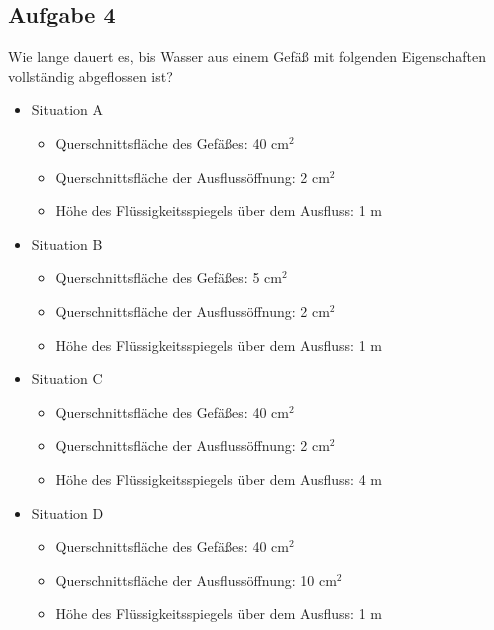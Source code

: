 \documentclass[nobib]{tufte-book}
\begin{document}
\pagebreak
\subsection*{Aufgabe 4}
Wie lange dauert es, bis Wasser aus einem Gefäß mit folgenden Eigenschaften vollständig abgeflossen ist?

\begin{itemize}
\item Situation A
\begin{itemize}
    \item  Querschnittsfläche des Gefäßes: 40 cm$^2$
    \item  Querschnittsfläche der Ausflussöffnung: 2 cm$^2$
    \item  Höhe des Flüssigkeitsspiegels über dem Ausfluss: 1 m
\end{itemize}
\item Situation B
\begin{itemize}
    \item  Querschnittsfläche des Gefäßes: 5 cm$^2$
    \item  Querschnittsfläche der Ausflussöffnung: 2 cm$^2$
    \item  Höhe des Flüssigkeitsspiegels über dem Ausfluss: 1 m
\end{itemize}
\item Situation C
\begin{itemize}
    \item  Querschnittsfläche des Gefäßes: 40 cm$^2$
    \item  Querschnittsfläche der Ausflussöffnung: 2 cm$^2$
    \item  Höhe des Flüssigkeitsspiegels über dem Ausfluss: 4 m
\end{itemize}
\item Situation D
\begin{itemize}
    \item  Querschnittsfläche des Gefäßes: 40 cm$^2$
    \item  Querschnittsfläche der Ausflussöffnung: 10 cm$^2$
    \item  Höhe des Flüssigkeitsspiegels über dem Ausfluss: 1 m
\end{itemize}
\end{itemize}
\end{document}
